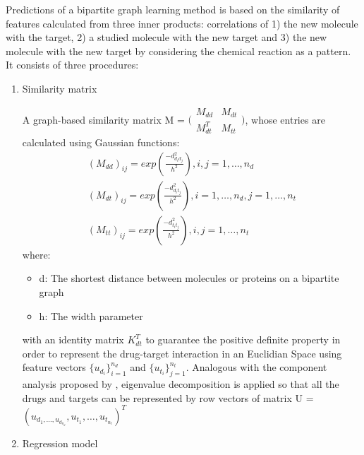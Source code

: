 \documentclass[a4paper,12pt]{report}
\begin{document}
Predictions of a bipartite graph learning method \citep{yam08} is based on the similarity of features calculated from three inner products: correlations of 1) the new molecule with the target, 2) a studied molecule with the new target and 3) the new molecule with the new target by considering the chemical reaction as a pattern. It consists of three procedures:
\begin{enumerate}
\item{Similarity matrix}

A graph-based similarity matrix M = $\bigl(\begin{smallmatrix}
M_{dd} &M_{dt} \\ M_{dt}^T& M_{tt}
\end{smallmatrix} \bigr)$, whose entries are calculated using Gaussian functions:
\begin{eqnarray}
(M_{dd})_{ij} = exp(\frac{-d^2_{d_id_j}}{h^2}), i, j = 1, \dots, n_d \\
(M_{dt})_{ij} = exp(\frac{-d^2_{d_it_j}}{h^2}), i = 1, \dots, n_d, j = 1, \dots, n_t \\
(M_{tt})_{ij} = exp(\frac{-d^2_{t_it_j}}{h^2}), i, j = 1, \dots, n_t 
\end{eqnarray}
where:
\begin{itemize}
\item[] d: The shortest distance between molecules or proteins on a bipartite graph
\item[] h: The width parameter
\end{itemize}
with an identity matrix $K^T_{dt}$ to guarantee the positive definite property in order to represent the drug-target interaction in an Euclidian Space using feature vectors $\{u_{d_i}\}^{n_d}_{i=1}$ and $\{u_{t_i}\}^{n_t}_{j=1}$. Analogous with the component analysis proposed by \citet{sch98}, eigenvalue decomposition is applied so that all the drugs and targets can be represented by row vectors of matrix U = $(u_{d_1, \dots, u_{d_{n_d}}}, u_{t_1}, \dots, u_{t_{n_t}})^T$

\item{Regression model}


\end{enumerate}
\end{document}
